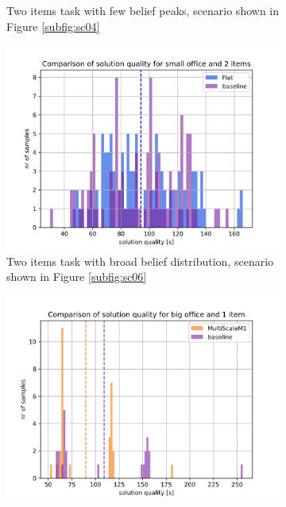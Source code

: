 \begin{figure}
\begin{subfigure}[t]{0.49\textwidth}
        \caption{Two items task with few belief peaks, scenario shown in Figure \ref{subfig:sc04}}
        \label{subfig:b1vsFlat_sc04}
    \end{subfigure}
    \hfill
    \begin{subfigure}[t]{0.49\textwidth}
        \includegraphics[width=\textwidth]{Report/images/sol_quality/envsmall_sc06_solqual_hist.png}
        \caption{Two items task with broad belief distribution, scenario shown in Figure \ref{subfig:sc06}}
        \label{subfig:b1vsFlat_sc06}
    \end{subfigure}
    \hfill
    \begin{subfigure}[t]{0.49\textwidth}
         \includegraphics[width=\textwidth]{Report/images/sol_quality/envbig_sc01_solqual_hist.png}

\end{subfigure}
\end{figure}
